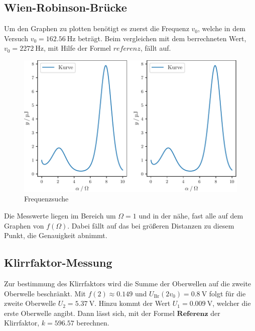  \subsection{Wien-Robinson-Brücke}
 Um den Graphen zu plotten benötigt es zuerst die Frequenz $v_0$, welche in dem Versuch $v_0=\SI{162.56}{\hertz}$ beträgt.
 Beim vergleichen mit dem berrechneten Wert, $v_0= \SI{2272}{\hertz}$, mit Hilfe der Formel $referenz$, fällt auf.
 \begin{figure}
  \caption{Frequenzsuche}
  \centering
  \includegraphics[width = \textwidth]{build/plot.pdf}
\end{figure}
Die Messwerte liegen im Bereich um $\Omega=1$ und in der nähe, fast alle auf dem Graphen von $f(\Omega)$. Dabei fällt auf das bei größeren Distanzen zu 
 diesem Punkt, die Genauigkeit abnimmt. 
\newpage 
\subsection{Klirrfaktor-Messung}
Zur bestimmung des Klirrfaktors wird die Summe der Oberwellen auf die zweite Oberwelle beschränkt.
Mit $f(2)\approx 0.149$ und $U_\text{Br}(2v_0)=\SI{0.8}{\volt}$ folgt für die zweite Oberwelle $U_2=\SI{5.37}{\volt}$.
Hinzu kommt der Wert $U_1=\SI{0.009}{\volt}$, welcher die erste Oberwelle angibt.
Dann lässt sich, mit der Formel $\symbf{Referenz}$ der Klirrfaktor, $k=596.57$ berechnen.
